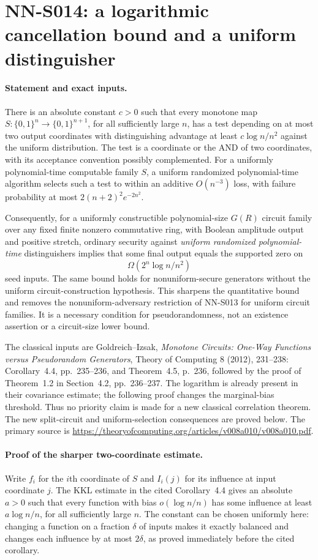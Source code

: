 \section{NN-S014: a logarithmic cancellation bound and a uniform distinguisher}

\paragraph{Statement and exact inputs.}
There is an absolute constant $c>0$ such that every monotone map
$S:\{0,1\}^n\to\{0,1\}^{n+1}$, for all sufficiently large $n$,
has a test depending on at most two output coordinates with distinguishing
advantage at least $c\log n/n^2$ against the uniform distribution.
The test is a coordinate or the AND of two coordinates, with its
acceptance convention possibly complemented. For a uniformly
polynomial-time computable family $S$, a uniform randomized polynomial-time
algorithm selects such a test to within an additive $O(n^{-3})$ loss,
with failure probability at most $2(n+2)^2e^{-2n^2}$.

Consequently, for a uniformly constructible polynomial-size $G(R)$ circuit
family over any fixed finite nonzero commutative ring, with Boolean
amplitude output and positive stretch, ordinary security against
\emph{uniform randomized polynomial-time} distinguishers implies that
some final output equals the supported zero on
\[
                 \Omega(2^n\log n/n^2)
\]
seed inputs. The same bound holds for nonuniform-secure generators without
the uniform circuit-construction hypothesis. This sharpens the quantitative
bound and removes the nonuniform-adversary restriction of NN-S013 for
uniform circuit families. It is a necessary condition for pseudorandomness,
not an existence assertion or a circuit-size lower bound.

The classical inputs are Goldreich--Izsak, \emph{Monotone Circuits:
One-Way Functions versus Pseudorandom Generators}, Theory of Computing
8 (2012), 231--238: Corollary~4.4, pp.~235--236, and Theorem~4.5,
p.~236, followed by the proof of Theorem~1.2 in Section~4.2,
pp.~236--237. The logarithm is already present in their covariance
estimate; the following proof changes the marginal-bias threshold.
Thus no priority claim is made for a new classical correlation theorem.
The new split-circuit and uniform-selection consequences are proved below.
The primary source is
\url{https://theoryofcomputing.org/articles/v008a010/v008a010.pdf}.

\paragraph{Proof of the sharper two-coordinate estimate.}
Write $f_i$ for the $i$th coordinate of $S$ and $I_i(j)$ for its
influence at input coordinate $j$. The KKL estimate in the cited
Corollary~4.4 gives an absolute $a>0$ such that every function with bias
$o(\log n/n)$ has some influence at least $a\log n/n$, for all
sufficiently large $n$. The constant can be chosen uniformly here:
changing a function on a fraction $\delta$ of inputs makes it exactly
balanced and changes each influence by at most $2\delta$, as proved
immediately before the cited corollary.

